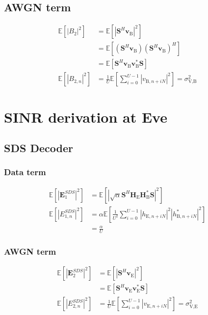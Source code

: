 \documentclass[journal,comsoc]{IEEEtran}
\newcommand{\module}[1]{\left|#1\right|}
\newcommand{\EX}[1]{\mathbb{E} \left[#1\right]}%
\newcommand{\HE}{\textbf{H}_{\text{E}}}
\newcommand{\HB}{\textbf{H}_{\text{B}}}
\newcommand{\vb}{\textbf{v}_{\text{B}}}
\newcommand{\ve}{\textbf{v}_{\text{E}}}
\newcommand{\spread}{\textbf{S}}
\begin{document}
\subsection{AWGN term}\label{sec:awgn-term-app}
\begin{equation}
	\begin{split}
		\EX{|B_2|^2} &=  \EX{\module{\spread^H \vb}^2} \\
		&= \EX{\left(\spread^H \vb \right)\left(\spread^H \vb \right)^H} \\
		&=\EX{\spread^H \vb \vb^* \spread } \\
		\EX{|B_{2,n}|^2} &= \frac{1}{U} \EX{\sum_{i=0}^{U-1} |v_{\text{B}, n + iN}|^2} = \sigma^2_{\text{V,B}}
	\end{split}
	\label{eq:appA:noise_bob-app}
\end{equation}





\section{SINR derivation at Eve}\label{sec:at-the-unintended-position-app}
\subsection{SDS Decoder}\label{sec:same-decoding-structure-as-bob-app}
\subsubsection{Data term}\label{sec:data-term-app-1}
\begin{equation}
	\begin{split}
		\EX{|\textbf{E}_{1}^{SDS}|^2} &= \EX{\module{\sqrt{\alpha}\spread^H \HE\HB^* \spread}^2} \\
		\EX{|E_{1,n}^{SDS}|^2}&=\alpha \EX{\frac{1}{U^2} \sum_{i=0}^{U-1} \left| h_{\text{E}, n + iN} \right|^2 \left| h^*_{\text{B}, n + iN}\right|^2 } \\
		&= \frac{\alpha}{U}
	\end{split}
	\label{eq:appA:data_eve_filt0-app}
\end{equation}



\subsubsection{AWGN term}\label{sec:awgn-term-app-1}
\begin{equation}
	\begin{split}
		\EX{|\textbf{E}_{2}^{SDS}|^2} &=  \EX{\module{\spread^H \ve}^2} \\
		&=\EX{\spread^H \ve \ve^* \spread } \\
		\EX{|E_{2,n}^{SDS}|^2} &= \frac{1}{U} \EX{\sum_{i=0}^{U-1} |v_{\text{E}, n + iN}|^2} = \sigma^2_{\text{V,E}}
	\end{split}
	\label{eq:appA:noise_eve_filt0-app}
\end{equation}
\end{document}
